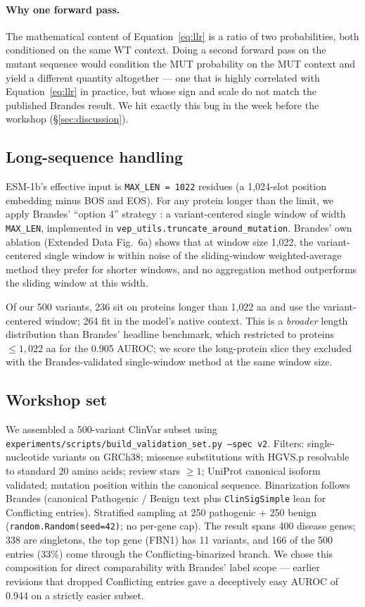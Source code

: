 \documentclass{article}
\begin{document}
\paragraph{Why one forward pass.} The mathematical content of
Equation~\ref{eq:llr} is a ratio of two probabilities, both conditioned
on the same WT context. Doing a second forward pass on the mutant
sequence would condition the MUT probability on the MUT context and
yield a different quantity altogether --- one that is highly correlated
with Equation~\ref{eq:llr} in practice, but whose sign and scale do not
match the published Brandes result. We hit exactly this bug in the
week before the workshop (\S\ref{sec:discussion}).

\subsection{Long-sequence handling}
\label{sec:methods:length}

ESM-1b's effective input is \texttt{MAX\_LEN = 1022} residues (a
1{,}024-slot position embedding minus BOS and EOS). For any protein
longer than the limit, we apply Brandes' \enquote{option 4} strategy
\citep{brandes2023}: a variant-centered single window of width
\texttt{MAX\_LEN}, implemented in
\texttt{vep\_utils.truncate\_around\_mutation}. Brandes' own ablation
(Extended Data Fig.~6a) shows that at window size 1{,}022, the
variant-centered single window is within noise of the sliding-window
weighted-average method they prefer for shorter windows, and no
aggregation method outperforms the sliding window at this width.

Of our 500 variants, 236 sit on proteins longer than 1{,}022 aa and use
the variant-centered window; 264 fit in the model's native context.
This is a \emph{broader} length distribution than Brandes' headline
benchmark, which restricted to proteins \(\leq 1{,}022\) aa for the
0.905 AUROC; we score the long-protein slice they excluded with the
Brandes-validated single-window method at the same window size.

\subsection{Workshop set}
\label{sec:methods:dataset}

We assembled a 500-variant ClinVar subset using
\texttt{experiments/scripts/build\_validation\_set.py --spec v2}.
Filters: single-nucleotide variants on GRCh38; missense substitutions
with HGVS.p resolvable to standard 20 amino acids; review stars
\(\geq 1\); UniProt canonical isoform validated; mutation position
within the canonical sequence. Binarization follows Brandes (canonical
Pathogenic / Benign text plus \texttt{ClinSigSimple} lean for
Conflicting entries). Stratified sampling at 250 pathogenic + 250 benign
(\texttt{random.Random(seed=42)}; no per-gene cap). The result spans 400
disease genes; 338 are singletons, the top gene (FBN1) has 11 variants,
and 166 of the 500 entries (33\%) come through the
Conflicting-binarized branch. We chose this composition for direct
comparability with Brandes' label scope --- earlier revisions that
dropped Conflicting entries gave a deceptively easy AUROC of 0.944 on a
strictly easier subset.
\end{document}
